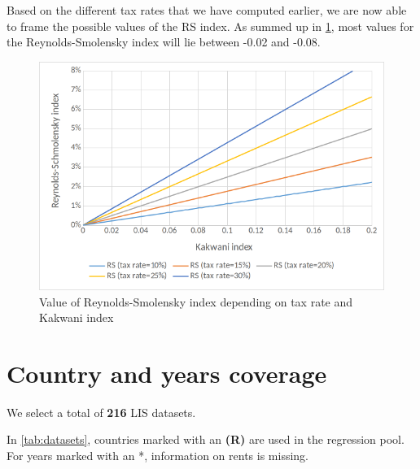 Based on the different tax rates that we have computed earlier, we are now able to frame the possible values of the RS index. As summed up in \cref{fig:RS_scenarii}, most values for the Reynolds-Smolensky index will lie between -0.02 and -0.08.
\begin{figure}
	\centering
	\includegraphics[scale=0.8]{images/18-12_RS_scenarii}
	\caption{Value of Reynolds-Smolensky index depending on tax rate and Kakwani index}
	\label{fig:RS_scenarii}
\end{figure}

\section{Country and years coverage}
\label{A-datasets}
We select a total of \textbf{216} LIS datasets. 

In \cref{tab:datasets}, countries marked with an \textbf{(R)} are used in the regression pool. For years marked with an *, information on rents is missing.

